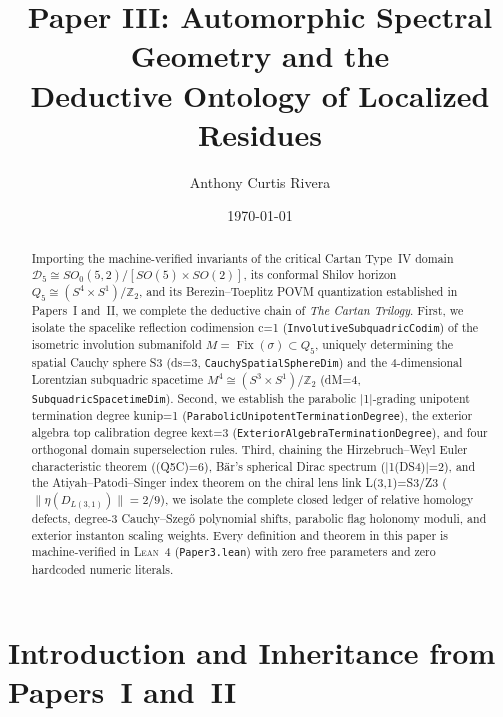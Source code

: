 \documentclass[11pt,reqno]{amsart}
\title[Automorphic Spectral Geometry and the Deductive Ontology of Localized Residues]{%
  Paper III: Automorphic Spectral Geometry and the\\
  Deductive Ontology of Localized Residues%
}
\author{Anthony Curtis Rivera}
\date{\today}
\theoremstyle{definition}
\theoremstyle{remark}
\newcommand{\Fix}{\operatorname{Fix}}
\begin{document}
\begin{abstract}
Importing the machine-verified invariants of the critical Cartan Type~IV domain $\mathcal{D}_5 \cong SO_0(5,2)/[SO(5)\times SO(2)]$, its conformal Shilov horizon $Q_5 \cong (S^4 \times S^1)/\mathbb{Z}_2$, and its Berezin--Toeplitz POVM quantization established in Papers~I and~II, we complete the deductive chain of \emph{The Cartan Trilogy}. First, we isolate the spacelike reflection codimension c=1 (\texttt{InvolutiveSubquadricCodim}) of the isometric involution submanifold $M = \Fix(\sigma) \subset Q_5$, uniquely determining the spatial Cauchy sphere S3 (ds=3, \texttt{CauchySpatialSphereDim}) and the 4-dimensional Lorentzian subquadric spacetime $M^4 \cong (S^3 \times S^1)/\mathbb{Z}_2$ (dM=4, \texttt{SubquadricSpacetimeDim}). Second, we establish the parabolic |1|-grading unipotent termination degree kunip=1 (\texttt{ParabolicUnipotentTerminationDegree}), the exterior algebra top calibration degree kext=3 (\texttt{ExteriorAlgebraTerminationDegree}), and four orthogonal domain superselection rules. Third, chaining the Hirzebruch--Weyl Euler characteristic theorem ((Q5C)=6), B\"ar's spherical Dirac spectrum (|1(DS4)|=2), and the Atiyah--Patodi--Singer index theorem on the chiral lens link L(3,1)=S3/Z3 ($\|\eta(D_{L(3,1)})\| = 2/9$), we isolate the complete closed ledger of relative homology defects, degree-3 Cauchy--Szeg\H{o} polynomial shifts, parabolic flag holonomy moduli, and exterior instanton scaling weights. Every definition and theorem in this paper is machine-verified in \textsc{Lean~4} (\texttt{Paper3.lean}) with zero free parameters and zero hardcoded numeric literals.
\end{abstract}

\maketitle
\tableofcontents

\section{Introduction and Inheritance from Papers~I and~II}
\end{document}
